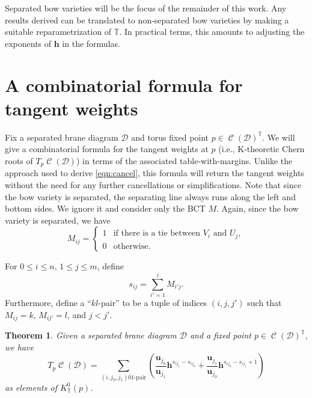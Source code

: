 \documentclass[11pt]{article}
\numberwithin{equation}{section}
\newtheorem{Theorem}{Theorem}[section]
\newcommand{\brane}{\mathcal D}
\newcommand{\torus}{\mathbb T}
\newcommand{\hb}{\mathbf h}
\newcommand{\ub}{\mathbf u}
\DeclareMathOperator{\bowvar}{\mathcal C}
\begin{document}
Separated bow varieties will be the focus of the remainder of this work. Any results derived can be translated to non-separated bow varieties by making a suitable reparametrization of $\torus$. In practical terms, this amounts to adjusting the exponents of $\hb$ in the formulas.


\section{A combinatorial formula for tangent weights} \label{sec:bct_weights}
Fix a separated brane diagram $\brane$ and torus fixed point $p\in\bowvar(\brane)^\torus$. We will give a combinatorial formula for the tangent weights at $p$ (i.e., K-theoretic Chern roots of $T_p\bowvar(\brane)$) in terms of the associated table-with-margins. Unlike the approach used to derive \eqref{eqn:cancel}, this formula will return the tangent weights without the need for any further cancellations or simplifications. Note that since the bow variety is separated, the separating line always runs along the left and bottom sides. We ignore it and consider only the BCT $M$. Again, since the bow variety is separated, we have
\[
M_{ij} = \begin{cases}
1 & \text{if there is a tie between }V_i\text{ and }U_j, \\
0 & \text{otherwise}. \end{cases}
\]

\begin{Definition} \label{def:pairs}
For $0\leq i \leq n$, $1 \leq j \leq m$, define
\[
s_{ij} = \sum_{i' = 1}^i M_{i' j}.
\]
Furthermore, define a ``$kl$-pair'' to be a tuple of indices $(i, j, j')$ such that $M_{i j} = k$, $M_{i j'} = l$, and $j < j'$.
\end{Definition}

\begin{Theorem} \label{thm:weights}
Given a separated brane diagram $\brane$ and a fixed point $p\in\bowvar(\brane)^\torus$, we have
\begin{equation*}
T_p\bowvar(\brane) = \sum_{(i, j_0, j_1)\text{$01$-pair}} \left(
 \frac{\ub_{j_0}}{\ub_{j_1}}\hb^{s_{i j_1}-s_{i j_0}} + \frac{\ub_{j_1}}{\ub_{j_0}}\hb^{s_{i j_0}-s_{i j_1}+1} \right)
\end{equation*}
as elements of $K^0_\torus(p)$.
\end{Theorem}
\end{document}
